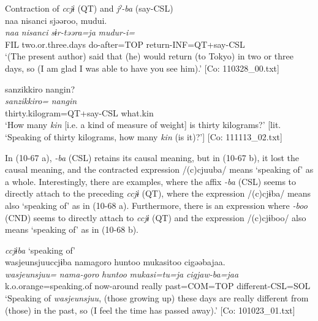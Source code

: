 \ea\label{ex:10.67}   Contraction of \textit{ccjɨ} (QT) and \textit{jˀ-ba} (say-CSL)\\
  \ea  %
      \glll    naa  {\textbar}nisanci{\textbar}  sjəəroo,  mudui.\\
          \textit{naa}  \textit{nisanci}  \textit{sɨr-təəra=ja}  \textit{mudur-i=}\\
      FIL  two.or.three.days  do-after=TOP  return-INF=QT+say-CSL\\
      \glt       ‘(The present author) said that (he) would return (to Tokyo) in two or three days, so (I am glad I was able to have you see him).’ [Co: 110328\_00.txt]

  \ex  %
      \glll    {\textbar}sanzikkiro{\textbar}  {\textbar}nangin{\textbar}?\\
      \textit{sanzikkiro=}  \textit{nangin}\\
      thirty.kilogram=QT+say-CSL  what.kin\\
    \glt       ‘How many \textit{kin} [i.e. a kind of measure of weight] is thirty kilograms?’ [lit. ‘Speaking of thirty kilograms, how many \textit{kin} (is it)?’] [Co: 111113\_02.txt]
    \z
\z

In (10-67 a), \textit{{}-ba} (CSL) retains its causal meaning, but in (10-67 b), it lost the causal meaning, and the contracted expression /(c)cjuuba/ means ‘speaking of’ as a whole. Interestingly, there are examples, where the affix \textit{{}-ba} (CSL) seems to directly attach to the preceding \textit{ccjɨ} (QT), where the expression /(c)cjɨba/ means also ‘speaking of’ as in (10-68 a). Furthermore, there is an expression where \textit{{}-boo} (CND) seems to directly attach to \textit{ccjɨ} (QT) and the expression /(c)cjɨboo/ also means ‘speaking of’ as in (10-68 b).

\ea\label{ex:10.68}
\ea \textit{ccjɨba} ‘speaking of’\\
      \glll    {\textbar}wasjeunsjuu{\textbar}ccjɨba  nama{\textbar}goro{\textbar}  huntoo  mukasitoo  cigəəbajaa.\\
    \textit{wasjeunsjuu=}  \textit{nama-goro}  \textit{huntoo}  \textit{mukasi=tu=ja}  \textit{cigjaw-ba=jaa}\\
    k.o.orange=speaking.of  now-around  really  past=COM=TOP  different-CSL=SOL\\
\glt     ‘Speaking of \textit{wasjeunsjuu}, (those growing up) these days are really different from (those) in the past, so (I feel the time has passed away).’  [Co: 101023\_01.txt]

